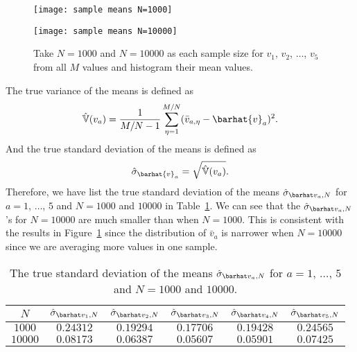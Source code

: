 \begin{figure}
    \centering
    \begin{minipage}[t]{0.8\linewidth}
        \centering
        \texttt{[image: sample means N=1000]}
        \label{fig:hist_mean:a}
    \end{minipage}
    \hfill
    \begin{minipage}[t]{0.8\linewidth}
        \centering
        \texttt{[image: sample means N=10000]}
        \label{fig:hist_mean:b}
    \end{minipage}
    \caption{Take \(N = 1000\) and \(N = 10000\) as each sample size
        for \(v_1\), \(v_2\), \(\ldots\), \(v_5\) from all \(M\) values
        and histogram their mean values.}
    \label{fig:hist_mean}
\end{figure}

The true variance of the means is defined as
%
\begin{equation}\label{eq:varva}
    \hat{\mathbb{V}}(v_a) = \frac{ 1 }{ M/N - 1 }
    \sum_{\eta=1}^{M/N} (\bar{v}_{a,\eta} - \barhat{v}_a)^2.
\end{equation}
%
And the true standard deviation of the means is defined as
%
\begin{equation}
    \hat{\sigma}_{\barhat{v}_a} = \sqrt{\hat{\mathbb{V}}(v_a)}.
\end{equation}
%
Therefore, we have list the true standard deviation of the means
\(\sgbar{a}\) for \(a = 1\), \(\ldots\), \(5\) and \(N = 1000\) and \(10000\)
in Table~\ref{tab:truestd}.
We can see that the \(\sgbar{a}\)'s for \(N = 10000\) are much smaller than
when \(N = 1000\). This is consistent with the results in Figure~\ref{fig:hist_mean}
since the distribution of \(\bar{v}_a\) is narrower when \(N = 10000\) since
we are averaging more values in one sample.

\begin{table}[H]
    \centering
    \caption{The true standard deviation of the means
        \(\sgbar{a}\) for \(a = 1\), \(\ldots\), \(5\) and \(N = 1000\) and \(10000\).}
    \label{tab:truestd}
    \begin{tabular}{@{}cccccc@{}}
        \toprule
        \(N\)     & \(\sgbar{1}\) & \(\sgbar{2}\) & \(\sgbar{3}\) & \(\sgbar{4}\) & \(\sgbar{5}\) \\
        \midrule
        \(1000\)  & \(0.24312\)   & \(0.19294\)   & \(0.17706\)   & \(0.19428\)   & \(0.24565\)   \\
        \(10000\) & \(0.08173\)   & \(0.06387\)   & \(0.05607\)   & \(0.05901\)   & \(0.07425\)   \\
        \bottomrule
    \end{tabular}
\end{table}

